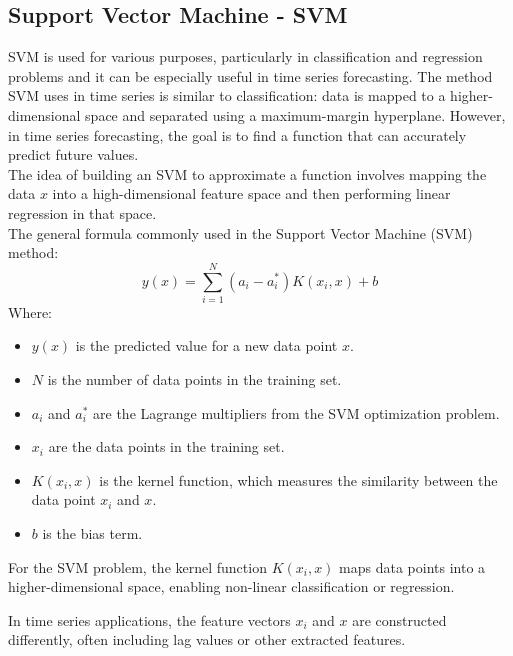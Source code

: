 \documentclass{ieeeojies}
\begin{document}
	\subsection{Support Vector Machine - SVM}
	SVM is used for various purposes, particularly in classification and regression problems and it can be especially useful in time series forecasting. The method SVM uses in time series is similar to classification: data is mapped to a higher-dimensional space and separated using a maximum-margin hyperplane. However, in time series forecasting, the goal is to find a function that can accurately predict future values. \\
    The idea of building an SVM to approximate a function involves mapping the data \( x \) into a high-dimensional feature space and then performing linear regression in that space. \\
The general formula commonly used in the Support Vector Machine (SVM) method: \cite{b10}
\[ y(x) = \sum_{i=1}^{N} (a_i - a_i^*) K(x_i, x) + b \]    
Where:
\begin{itemize}
    \item \( y(x) \) is the predicted value for a new data point \( x \).
    \item \( N \) is the number of data points in the training set.
    \item \( a_i \) and \( a_i^* \) are the Lagrange multipliers from the SVM optimization problem.
    \item \( x_i \) are the data points in the training set.
    \item \( K(x_i, x) \) is the kernel function, which measures the similarity between the data point \( x_i \) and \( x \).
    \item \( b \) is the bias term.
\end{itemize}

For the SVM problem, the kernel function \( K(x_i, x) \) maps data points into a higher-dimensional space, enabling non-linear classification or regression.

In time series applications, the feature vectors \( x_i \) and \( x \) are constructed differently, often including lag values or other extracted features.
\end{document}
